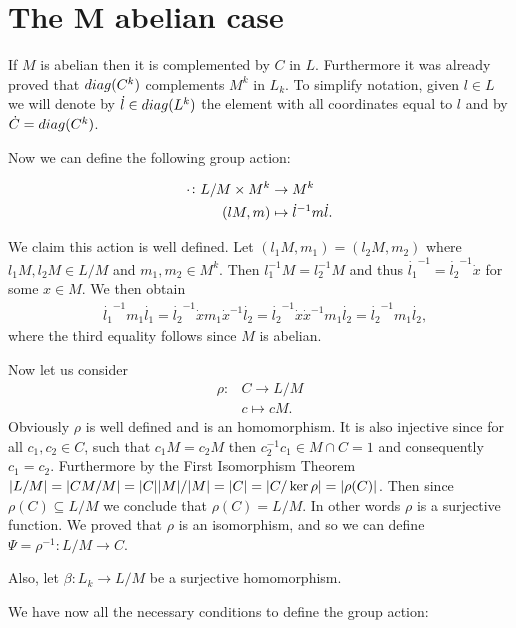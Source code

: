 \section{The M abelian case}

\newcommand{\dc}[0]{\dot{c}}

If $M$ is abelian then it is complemented by $C$ in $L$. Furthermore it was already proved that $diag({C^k})$ complements $M^k$ in $L_k$. To simplify notation, given $l \in L$ we will denote by $\dot{l} \in diag({L^k})$ the element with all coordinates equal to $l$ and by $\dot{C} = diag({C^k})$.

Now we can define the following group action:

\begin{align*}
    \cdot \colon L/M \times M^k &\rightarrow M^k \\
                (lM, m)  &\mapsto \dot{l}^{-1}m\dot{l}.
\end{align*}

We claim this action is well defined. Let $(l_1M, m_1) = (l_2M, m_2)$ where $l_1M, l_2M \in L/M$ and $m_1, m_2 \in M^k$.
Then $l_1^{-1}M = l_2^{-1}M$ and thus $\dot{l_1}^{-1} = \dot{l_2}^{-1}\dot{x}$ for some $x \in M$. We then obtain 
\begin{align*}
    &\dot{l_1}^{-1}m_1\dot{l_1} = \dot{l_2}^{-1}\dot{x}m_1\dot{x}^{-1}\dot{l_2} = \dot{l_2}^{-1}\dot{x}\dot{x}^{-1}m_1\dot{l_2} = \dot{l_2}^{-1}m_1\dot{l_2},
\end{align*}
where the third equality follows since $M$ is abelian.

Now let us consider
\begin{align*}
    \rho \colon &C \rightarrow L/M \\
                &c \mapsto cM.
\end{align*}
Obviously $\rho$ is well defined and is an homomorphism. It is also injective since for all $c_1, c_2 \in C$, such that $c_1M = c_2M$ then $c_2^{-1}c_1 \in M \cap C = 1$ and consequently $c_1 = c_2$. Furthermore by the First Isomorphism Theorem $| L/M | = | CM/M | = | C || M |/| M | = | C | = | C/\ker \rho | = | \rho(C) |$. Then since $\rho(C) \subseteq L/M$ we conclude that $\rho(C) = L/M$. In other words $\rho$ is a surjective function. We proved that $\rho$ is an isomorphism, and so we can define $\Psi = \rho^{-1} \colon L/M \rightarrow C$.  

Also, let $\beta \colon L_k \rightarrow L/M$ be a surjective homomorphism.

We have now all the necessary conditions to define the group action:

